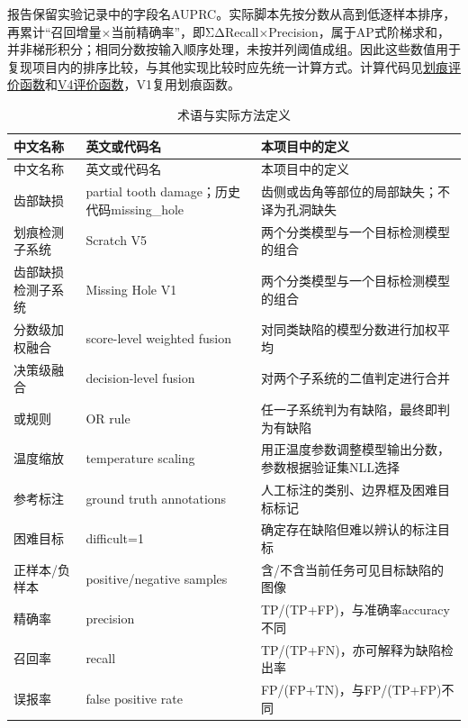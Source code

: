 报告保留实验记录中的字段名AUPRC。实际脚本先按分数从高到低逐样本排序，再累计“召回增量\ensuremath{\times}当前精确率”，即ΣΔRecall\ensuremath{\times}Precision，属于AP式阶梯求和，并非梯形积分；相同分数按输入顺序处理，未按并列阈值成组。因此这些数值用于复现项目内的排序比较，与其他实现比较时应先统一计算方式。计算代码见\protect\href{run:../../../train_scratch_v5.py}{划痕评价函数}和\protect\href{run:../../../train_binary_defect_v4.py}{V4评价函数}，V1复用划痕函数。


\begingroup\small{}
\begin{longtable}{@{}>{\raggedright\arraybackslash}p{0.240\dimexpr\linewidth-4\tabcolsep\relax}>{\raggedright\arraybackslash}p{0.340\dimexpr\linewidth-4\tabcolsep\relax}>{\raggedright\arraybackslash}p{0.420\dimexpr\linewidth-4\tabcolsep\relax}@{}}
\caption{术语与实际方法定义}\\
\toprule
中文名称 & 英文或代码名 & 本项目中的定义 \\
\midrule\endfirsthead
\toprule
中文名称 & 英文或代码名 & 本项目中的定义 \\
\midrule\endhead
\midrule\multicolumn{3}{r}{\footnotesize 续下页}\endfoot
\bottomrule\endlastfoot
齿部缺损 & partial tooth damage；历史代码missing\_hole & 齿侧或齿角等部位的局部缺失；不译为孔洞缺失 \\
划痕检测子系统 & Scratch V5 & 两个分类模型与一个目标检测模型的组合 \\
齿部缺损检测子系统 & Missing Hole V1 & 两个分类模型与一个目标检测模型的组合 \\
分数级加权融合 & score-level weighted fusion & 对同类缺陷的模型分数进行加权平均 \\
决策级融合 & decision-level fusion & 对两个子系统的二值判定进行合并 \\
或规则 & OR rule & 任一子系统判为有缺陷，最终即判为有缺陷 \\
温度缩放 & temperature scaling & 用正温度参数调整模型输出分数，参数根据验证集NLL选择 \\
参考标注 & ground truth annotations & 人工标注的类别、边界框及困难目标标记 \\
困难目标 & difficult=1 & 确定存在缺陷但难以辨认的标注目标 \\
正样本/负样本 & positive/negative samples & 含/不含当前任务可见目标缺陷的图像 \\
精确率 & precision & TP/(TP+FP)，与准确率accuracy不同 \\
召回率 & recall & TP/(TP+FN)，亦可解释为缺陷检出率 \\
误报率 & false positive rate & FP/(FP+TN)，与FP/(TP+FP)不同 \\

\end{longtable}
